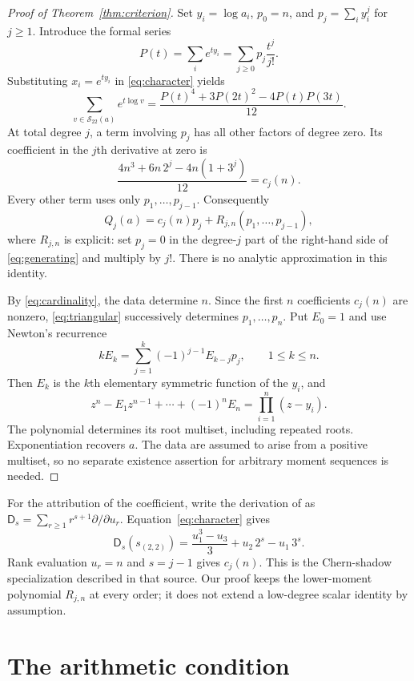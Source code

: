 \documentclass[11pt]{amsart}
\theoremstyle{remark}
\newcommand{\Sxx}{\mathcal{S}_{22}}
\begin{document}
\begin{proof}[Proof of Theorem~\ref{thm:criterion}]
Set $y_i=\log a_i$, $p_0=n$, and $p_j=\sum_i y_i^j$ for $j\geq1$.
Introduce the formal series
\[
 P(t)=\sum_i e^{t y_i}=\sum_{j\geq0}p_j\frac{t^j}{j!}.
\]
Substituting $x_i=e^{t y_i}$ in \eqref{eq:character} yields
\begin{equation}\label{eq:generating}
 \sum_{v\in\Sxx(a)}e^{t\log v}
   =\frac{P(t)^4+3P(2t)^2-4P(t)P(3t)}{12}.
\end{equation}
At total degree $j$, a term involving $p_j$ has all other factors of
degree zero. Its coefficient in the $j$th derivative at zero is
\[
 \frac{4n^3+6n\,2^j-4n(1+3^j)}{12}=c_j(n).
\]
Every other term uses only $p_1,\ldots,p_{j-1}$. Consequently
\begin{equation}\label{eq:triangular}
 Q_j(a)=c_j(n)p_j+R_{j,n}(p_1,\ldots,p_{j-1}),
\end{equation}
where $R_{j,n}$ is explicit: set $p_j=0$ in the degree-$j$ part of
the right-hand side of \eqref{eq:generating} and multiply by $j!$.
There is no analytic approximation in this identity.

By \eqref{eq:cardinality}, the data determine $n$. Since the first $n$
coefficients $c_j(n)$ are nonzero, \eqref{eq:triangular} successively
determines $p_1,\ldots,p_n$. Put $E_0=1$ and use Newton's recurrence
\begin{equation}\label{eq:newton}
 kE_k=\sum_{j=1}^k(-1)^{j-1}E_{k-j}p_j,
 \qquad 1\leq k\leq n.
\end{equation}
Then $E_k$ is the $k$th elementary symmetric function of the $y_i$, and
\[
 z^n-E_1z^{n-1}+\cdots+(-1)^nE_n=\prod_{i=1}^n(z-y_i).
\]
The polynomial determines its root multiset, including repeated roots.
Exponentiation recovers $a$. The data are assumed to arise from a
positive multiset, so no separate existence assertion for arbitrary
moment sequences is needed.
\end{proof}

For the attribution of the coefficient, write the derivation of
\cite[Definition~3.2]{DAndreaEtAl2025} as
$\mathsf D_s=\sum_{r\geq1}r^{s+1}\partial/\partial u_r$.
Equation~\eqref{eq:character} gives
\[
 \mathsf D_s(s_{(2,2)})
 =\frac{u_1^3-u_3}{3}+u_2\,2^s-u_1\,3^s.
\]
Rank evaluation $u_r=n$ and $s=j-1$ gives $c_j(n)$. This is the
Chern-shadow specialization described in that source. Our proof keeps
the lower-moment polynomial $R_{j,n}$ at every order; it does not extend
a low-degree scalar identity by assumption.

\section{The arithmetic condition}
\end{document}
